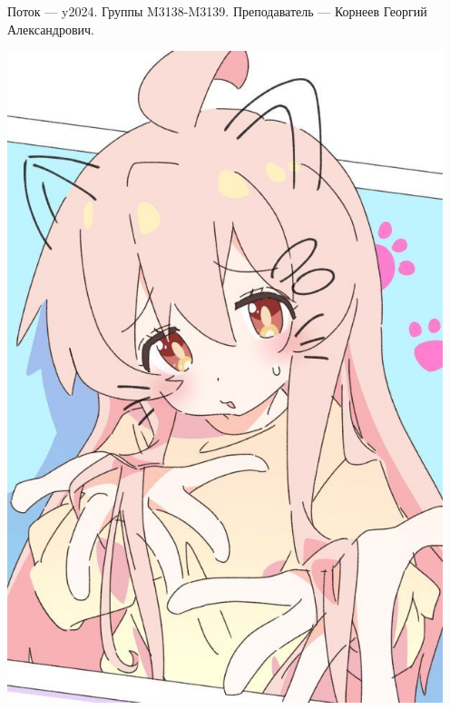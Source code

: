 Поток — y2024.\newline
Группы M3138-M3139.\newline
Преподаватель --- Корнеев Георгий Александрович.\par

\begin{center}
   \includegraphics[height=19cm]{assets/mahiru.jpg}
\end{center}

